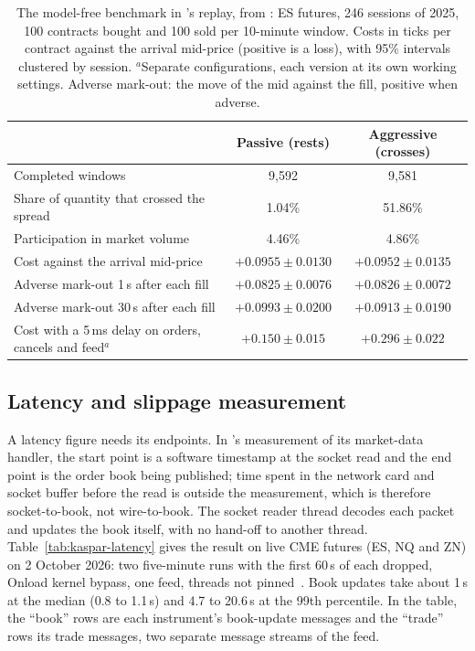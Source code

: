 \begin{table}[!htbp]
\centering\footnotesize
\caption{The model-free benchmark in \kasparhft{}'s replay, from \citet{maciejewski_shadow}: ES futures, 246 sessions of
2025, 100 contracts bought and 100 sold per 10-minute window. Costs in ticks per contract against the arrival
mid-price (positive is a loss), with 95\% intervals clustered by session. $^{a}$Separate configurations, each
version at its own working settings. Adverse mark-out: the move of the mid against the fill, positive when
adverse.}
\label{tab:shadow-results}
\begin{tabular}{lcc}
\toprule
& Passive (rests) & Aggressive (crosses) \\
\midrule
Completed windows & 9,592 & 9,581 \\
Share of quantity that crossed the spread & 1.04\% & 51.86\% \\
Participation in market volume & 4.46\% & 4.86\% \\
Cost against the arrival mid-price & $+0.0955 \pm 0.0130$ & $+0.0952 \pm 0.0135$ \\
Adverse mark-out 1\,s after each fill & $+0.0825 \pm 0.0076$ & $+0.0826 \pm 0.0072$ \\
Adverse mark-out 30\,s after each fill & $+0.0993 \pm 0.0200$ & $+0.0913 \pm 0.0190$ \\
Cost with a 5\,ms delay on orders, cancels and feed$^{a}$ & $+0.150 \pm 0.015$ & $+0.296 \pm 0.022$ \\
\bottomrule
\end{tabular}
\end{table}


\subsection{Latency and slippage measurement}
\label{sec:kaspar-measurement}

A latency figure needs its endpoints. In \kasparhft{}'s measurement of its market-data handler, the start point is a
software timestamp at the socket read and the end point is the order book being published; time spent in the network
card and socket buffer before the read is outside the measurement, which is therefore socket-to-book, not
wire-to-book. The socket reader thread decodes each packet and updates the book itself, with no hand-off to another
thread. Table~\ref{tab:kaspar-latency} gives the result on live CME futures (ES, NQ and ZN) on 2 October 2026: two
five-minute runs with the first 60\,s of each dropped, Onload kernel bypass, one feed, threads not
pinned~\citep{kaspar_hft}. Book updates take about 1\,\textmu s at the median (0.8 to 1.1\,\textmu s) and 4.7 to
20.6\,\textmu s at the 99th percentile. In the table, the ``book'' rows are each instrument's book-update messages and
the ``trade'' rows its trade messages, two separate message streams of the feed.

